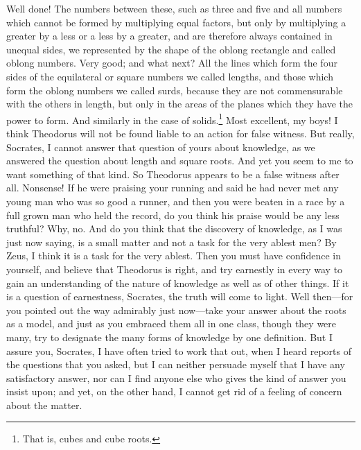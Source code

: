 \documentclass[letterpaper,12pt]{article}
\newcommand{\stephpag}[1]{\marginnote{\small\itshape\fontfamily{ppl}\selectfont #1}}
\begin{document}
\begin{drama}
\socratesspeaks
Well done!
\theaetetusspeaks
The numbers between these, such as three \stephpag{148 a} and five and all numbers which cannot be formed by multiplying equal factors, but only by multiplying a greater by a less or a less by a greater, and are therefore always contained in unequal sides, we represented by the shape of the oblong rectangle and called oblong numbers.
\socratesspeaks
Very good; and what next?
\theaetetusspeaks
All the lines which form the four sides of the equilateral or square numbers we called lengths, and those which form the oblong numbers we called surds, because they are not commensurable with the others \stephpag{b} in length, but only in the areas of the planes which they have the power to form. And similarly in the case of solids.\footnote{That is, cubes and cube roots.}
\socratesspeaks
Most excellent, my boys! I think Theodorus will not be found liable to an action for false witness.
\theaetetusspeaks
But really, Socrates, I cannot answer that question of yours about knowledge, as we answered the question about length and square roots. And yet you seem to me to want something of that kind. So Theodorus appears to be a false witness after all. \stephpag{c}
\socratesspeaks
Nonsense! If he were praising your running and said he had never met any young man who was so good a runner, and then you were beaten in a race by a full grown man who held the record, do you think his praise would be any less truthful?
\theaetetusspeaks
Why, no.
\socratesspeaks
And do you think that the discovery of knowledge, as I was just now saying, is a small matter and not a task for the very ablest men?
\theaetetusspeaks
By Zeus, I think it is a task for the very ablest.
\socratesspeaks
Then you must have confidence in yourself, and believe that Theodorus is right, \stephpag{d} and try earnestly in every way to gain an understanding of the nature of knowledge as well as of other things.
\theaetetusspeaks
If it is a question of earnestness, Socrates, the truth will come to light.
\socratesspeaks
Well then—for you pointed out the way admirably just now—take your answer about the roots as a model, and just as you embraced them all in one class, though they were many, try to designate the many forms of knowledge by one definition. \stephpag{e}
\theaetetusspeaks
But I assure you, Socrates, I have often tried to work that out, when I heard reports of the questions that you asked, but I can neither persuade myself that I have any satisfactory answer, nor can I find anyone else who gives the kind of answer you insist upon; and yet, on the other hand, I cannot get rid of a feeling of concern about the matter.

\end{drama}
\end{document}
